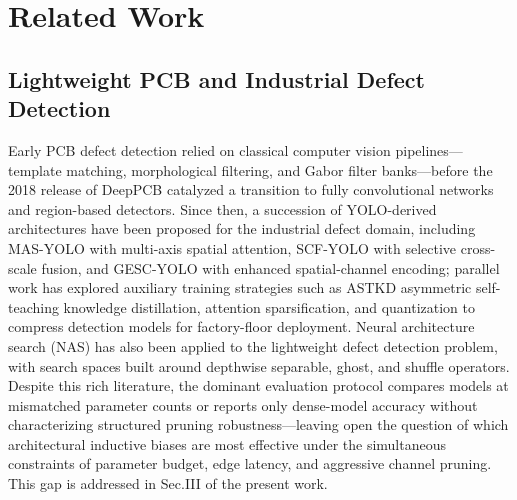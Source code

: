 \documentclass[conference]{IEEEtran}
\providecommand{\DIFadd}[1]{{\protect\color{blue}#1}}
\begin{document}
\section{\DIFadd{Related Work}}
\label{sec:related}

\subsection{\DIFadd{Lightweight PCB and Industrial Defect Detection}}
\DIFadd{Early PCB defect detection relied on classical computer vision pipelines—template matching, morphological filtering, and Gabor filter banks—before the 2018 release of DeepPCB catalyzed a transition to fully convolutional networks and region-based detectors.} \DIFadd{Since then, a succession of YOLO-derived architectures have been proposed for the industrial defect domain, including MAS-YOLO with multi-axis spatial attention, SCF-YOLO with selective cross-scale fusion, and GESC-YOLO with enhanced spatial-channel encoding; parallel work has explored auxiliary training strategies such as ASTKD asymmetric self-teaching knowledge distillation, attention sparsification, and quantization to compress detection models for factory-floor deployment.} \DIFadd{Neural architecture search (NAS) has also been applied to the lightweight defect detection problem, with search spaces built around depthwise separable, ghost, and shuffle operators.} \DIFadd{Despite this rich literature, the dominant evaluation protocol compares models at mismatched parameter counts or reports only dense-model accuracy without characterizing structured pruning robustness—leaving open the question of which architectural inductive biases are most effective under the simultaneous constraints of parameter budget, edge latency, and aggressive channel pruning.} \DIFadd{This gap is addressed in Sec.III of the present work.}
\end{document}

